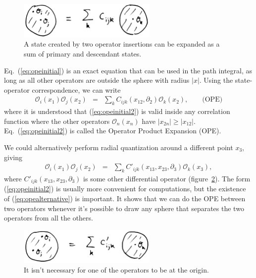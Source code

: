 \documentclass[11pt]{ws-rv9x6}
\newcommand\be{\begin{eqnarray}}
\newcommand\ee{\end{eqnarray}}
\newcommand\cO{\mathcal{O}}
\newcommand\ptl\partial
\newcommand\<\langle
\renewcommand\>\rangle
\renewcommand\.{\cdot}
\begin{document}
\begin{figure}
\begin{center}
\includegraphics[width=0.6\textwidth]{ope.jpg}
\end{center}
\caption{A state created by two operator insertions can be expanded as a sum of primary and descendant states.  \label{fig:ope}}
\end{figure}

Eq.~(\ref{eq:opeinitial}) is an exact equation that can be used in the path integral, as long as all other operators are outside the sphere with radius $|x|$.  Using the state-operator correspondence, we can write
\be
\label{eq:opeinitial2}
\cO_i(x_1)\cO_j(x_2) &=& \sum_{k}C_{ijk}(x_{12},\ptl_2)\cO_k(x_2),\qquad\textrm{(OPE)}
\ee
where it is understood that (\ref{eq:opeinitial2}) is valid inside any correlation function where the other operators $\cO_n(x_n)$ have $|x_{2n}|\geq |x_{12}|$.  Eq.~(\ref{eq:opeinitial2}) is called the Operator Product Expansion (OPE).

We could alternatively perform radial quantization around a different point $x_3$, giving
\be
\label{eq:opealternative}
\cO_i(x_1)\cO_j(x_2) &=& \sum_k C'_{ijk}(x_{13},x_{23},\ptl_3)\cO_k(x_3),
\ee
where $C'_{ijk}(x_{13},x_{23},\ptl_3)$ is some other differential operator (figure~\ref{fig:radialquantotherpoint}).  The form  (\ref{eq:opeinitial2}) is usually more convenient for computations, but the existence of (\ref{eq:opealternative}) is important. It shows that we can do the OPE between two operators whenever it's possible to draw any sphere that separates the two operators from all the others.

\begin{figure}
\begin{center}
\includegraphics[width=0.6\textwidth]{radialquantotherpoint.jpg}
\end{center}
\caption{It isn't necessary for one of the operators to be at the origin.  \label{fig:radialquantotherpoint}}
\end{figure}
\end{document}
